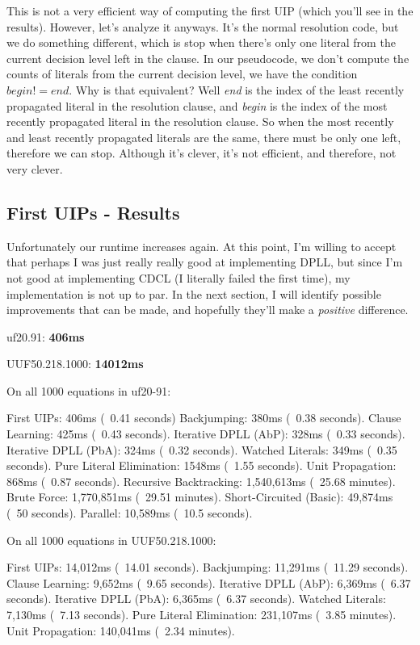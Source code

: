 This is not a very efficient way of computing the first UIP (which you'll see in the 
results). However, let's analyze it anyways. It's the normal resolution code, but we 
do something different, which is stop when there's only one literal from the current 
decision level left in the clause. In our pseudocode, we don't compute the counts of 
literals from the current decision level, we have the condition $begin != end$. Why is 
that equivalent? Well \textit{end} is the index of the least recently propagated literal 
in the resolution clause, and \textit{begin} is the index of the most recently propagated 
literal in the resolution clause. So when the most recently and least recently propagated 
literals are the same, there must be only one left, therefore we can stop. Although it's 
clever, it's not efficient, and therefore, not very clever.

\subsection{First UIPs - Results}

Unfortunately our runtime increases again. At this point, I'm willing to accept
that perhaps I was just really really good at implementing DPLL, but since I'm not 
good at implementing CDCL (I literally failed the first time), my implementation 
is not up to par. In the next section, I will identify possible improvements that 
can be made, and hopefully they'll make a \textit{positive} difference.

\noindent
uf20.91: \textbf{406ms}

\noindent
UUF50.218.1000: \textbf{14012ms}

\begin{FVerbatim}
On all 1000 equations in uf20-91:

First UIPs:                406ms (~0.41 seconds)
Backjumping:               380ms (~0.38 seconds).
Clause Learning:           425ms (~0.43 seconds).
Iterative DPLL (AbP):      328ms (~0.33 seconds).
Iterative DPLL (PbA):      324ms (~0.32 seconds).
Watched Literals:          349ms (~0.35 seconds).
Pure Literal Elimination:  1548ms (~1.55 seconds).
Unit Propagation:          868ms (~0.87 seconds).
Recursive Backtracking:    1,540,613ms (~25.68 minutes).
Brute Force:               1,770,851ms (~29.51 minutes).
Short-Circuited (Basic):   49,874ms (~50 seconds).
Parallel:                  10,589ms (~10.5 seconds).

On all 1000 equations in UUF50.218.1000:

First UIPs:               14,012ms (~14.01 seconds).
Backjumping:              11,291ms (~11.29 seconds).
Clause Learning:          9,652ms (~9.65 seconds).
Iterative DPLL (AbP):     6,369ms (~6.37 seconds).
Iterative DPLL (PbA):     6,365ms (~6.37 seconds).
Watched Literals:         7,130ms (~7.13 seconds).
Pure Literal Elimination: 231,107ms (~3.85 minutes).
Unit Propagation:         140,041ms (~2.34 minutes).
\end{FVerbatim}